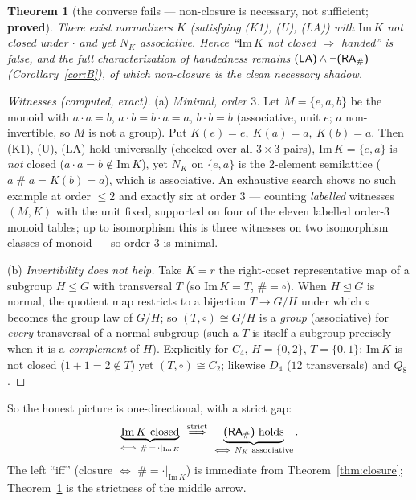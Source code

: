 \documentclass[11pt]{amsart}
\theoremstyle{plain}
\newtheorem{theorem}{Theorem}[section]
\theoremstyle{definition}
\theoremstyle{remark}
\newcommand{\Img}{\mathrm{Im}\,}
\newcommand{\sh}{\mathbin{\#}}
\newcommand{\LA}{\textsf{(LA)}}
\newcommand{\RA}{\textsf{(RA}\textsubscript{\#}\textsf{)}}
\begin{document}
\begin{theorem}[the converse fails --- non-closure is necessary, not sufficient; \textbf{proved}]
\label{thm:converse}
There exist normalizers $K$ (satisfying \textsf{(K1)}, \textsf{(U)}, \LA{}) with $\Img K$ \emph{not}
closed under $\cdot$ and yet $N_{K}$ \emph{associative}. Hence ``$\Img K$ not closed $\Rightarrow$
handed'' is false, and the full characterization of handedness remains $\LA\wedge\neg\RA$
(Corollary~\ref{cor:B}), of which non-closure is the clean \emph{necessary} shadow.
\end{theorem}
\begin{proof}[Witnesses (computed, exact)]
(a) \emph{Minimal, order $3$.} Let $M=\{e,a,b\}$ be the monoid with $a\cdot a=b$, $a\cdot b=b\cdot
a=a$, $b\cdot b=b$ (associative, unit $e$; $a$ non-invertible, so $M$ is not a group). Put
$K(e)=e,\ K(a)=a,\ K(b)=a$. Then \textsf{(K1)}, \textsf{(U)}, \LA{} hold universally (checked over all
$3\times3$ pairs), $\Img K=\{e,a\}$ is \emph{not} closed ($a\cdot a=b\notin\Img K$), yet $N_{K}$ on
$\{e,a\}$ is the $2$-element semilattice ($a\sh a=K(b)=a$), which is associative. An exhaustive search
shows no such example at order $\le 2$ and exactly six at order $3$ --- counting \emph{labelled}
witnesses $(M,K)$ with the unit fixed, supported on four of the eleven labelled order-$3$ monoid
tables; up to isomorphism this is three witnesses on two isomorphism classes of monoid --- so order
$3$ is minimal.

(b) \emph{Invertibility does not help.} Take $K=r$ the right-coset representative map of a subgroup
$H\le G$ with transversal $T$ (so $\Img K=T$, $\sh=\circ$). When $H\trianglelefteq G$ is normal, the
quotient map restricts to a bijection $T\to G/H$ under which $\circ$ becomes the group law of $G/H$;
so $(T,\circ)\cong G/H$ is a \emph{group} (associative) for \emph{every} transversal of a normal
subgroup (such a $T$ is itself a subgroup precisely when it is a \emph{complement} of $H$).
Explicitly for $C_4$, $H=\{0,2\}$,
$T=\{0,1\}$: $\Img K$ is not closed ($1+1=2\notin T$) yet $(T,\circ)\cong C_2$; likewise $D_4$
($12$ transversals) and $Q_8$.
\end{proof}

So the honest picture is one-directional, with a strict gap:
\[
  \underbrace{\Img K\text{ closed}}_{\Longleftrightarrow\ \sh\,=\,\cdot|_{\Img K}}
  \ \overset{\text{strict}}{\Longrightarrow}\
  \underbrace{\RA{}\text{ holds}}_{\Longleftrightarrow\ N_K\text{ associative}}.
\]
The left ``iff'' (closure $\Leftrightarrow$ $\sh=\cdot|_{\Img K}$) is immediate from
Theorem~\ref{thm:closure}; Theorem~\ref{thm:converse} is the strictness of the middle arrow.
\end{document}

